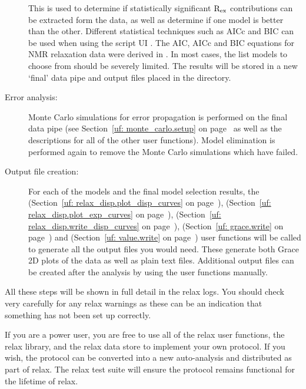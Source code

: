 \begin{description}
    This is used to determine if statistically significant $\mathrm{R}_\textrm{ex}$ contributions can be extracted form the data, as well as determine if one model is better than the other.
    Different statistical techniques such as AICc and BIC can be used when using the script UI \citep{HurvichTsai89,Schwarz78}.
    The AIC, AICc and BIC equations for NMR relaxation data were derived in \citet{dAuvergneGooley03}.
    In most cases, the list models to choose from should be severely limited.
    The results will be stored in a new `final' data pipe and output files placed in the  directory.
  \item[Error analysis:]  Monte Carlo simulations for error propagation is performed on the final data pipe (see Section~\ref{uf: monte_carlo.setup} on page~\pageref{uf: monte_carlo.setup} as well as the descriptions for all of the other  user functions).
    Model elimination is performed again to remove the Monte Carlo simulations which have failed.
  \item[Output file creation:]  For each of the models and the final model selection results, the  (Section~\ref{uf: relax_disp.plot_disp_curves} on page~\pageref{uf: relax_disp.plot_disp_curves}),  (Section~\ref{uf: relax_disp.plot_exp_curves} on page~\pageref{uf: relax_disp.plot_exp_curves}),  (Section~\ref{uf: relax_disp.write_disp_curves} on page~\pageref{uf: relax_disp.write_disp_curves}),  (Section~\ref{uf: grace.write} on page~\pageref{uf: grace.write}) and  (Section~\ref{uf: value.write} on page~\pageref{uf: value.write}) user functions will be called to generate all the output files you would need.
    These generate both Grace 2D plots of the data as well as plain text files.
    Additional output files can be created after the analysis by using the user functions manually.
\end{description}

All these steps will be shown in full detail in the relax logs.
You should check very carefully for any relax warnings as these can be an indication that something has not been set up correctly.

If you are a power user, you are free to use all of the relax user functions, the relax library, and the relax data store to implement your own protocol.
If you wish, the protocol can be converted into a new auto-analysis and distributed as part of relax.
The relax test suite will ensure the protocol remains functional for the lifetime of relax.


